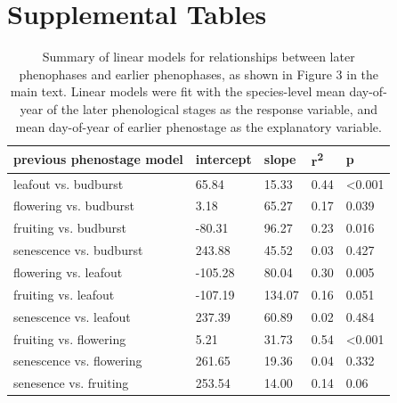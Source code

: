 \documentclass{article}
\begin{document}
\section* {Supplemental Tables}
\begin{table}[ht]
\centering
\caption{Summary of linear models for relationships between later phenophases and earlier phenophases, as shown in Figure 3 in the main text. Linear models were fit with the species-level mean day-of-year of the later phenological stages as the response variable,
and mean day-of-year of earlier phenostage as the explanatory variable.} 
\label{table:prevphase}
\begin{tabular}{|p{}|p{}|p{}|p{}|p{}|}
  \hline
previous phenostage model & intercept & slope & r\textsuperscript{2} & p \\ 
  \hline
leafout vs. budburst & 65.84 & 15.33 & 0.44 & <0.001 \\ 
  flowering vs. budburst & 3.18 & 65.27 & 0.17 & 0.039 \\ 
  fruiting vs. budburst & -80.31 & 96.27 & 0.23 & 0.016 \\ 
  senescence vs. budburst & 243.88 & 45.52 & 0.03 & 0.427 \\ 
  flowering vs. leafout & -105.28 & 80.04 & 0.30 & 0.005 \\ 
  fruiting vs. leafout & -107.19 & 134.07 & 0.16 & 0.051 \\ 
  senescence vs. leafout & 237.39 & 60.89 & 0.02 & 0.484 \\ 
  fruiting vs. flowering & 5.21 & 31.73 & 0.54 & <0.001 \\ 
  senescence vs. flowering & 261.65 & 19.36 & 0.04 & 0.332 \\ 
  senesence vs. fruiting & 253.54 & 14.00 & 0.14 & 0.06 \\ 
   \hline
\end{tabular}
\end{table}%
\end{document}
